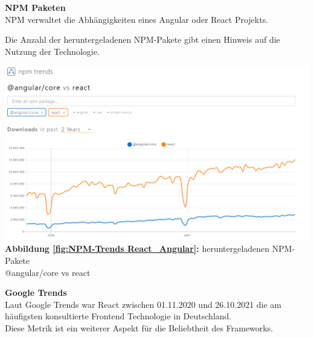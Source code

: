 {\cite{GH04, GH06}}%

\begin{flushleft}

\textbf{NPM Paketen}\\
NPM verwaltet die Abhängigkeiten eines Angular oder React Projekts.

Die Anzahl der heruntergeladenen NPM-Pakete gibt einen Hinweis auf die Nutzung der Technologie.
\end{flushleft}

\begin{center}
  \includegraphics[scale=0.4]
  {sources/NPM-Trends React_Angular}\label{fig:NPM-Trends React_Angular}\\
  \textbf{Abbildung \autoref{fig:NPM-Trends React_Angular}:} heruntergeladenen NPM-Pakete \\@angular/core vs react
    {\cite{NPM01}}
\end{center}

\newpage

\begin{flushleft}
\textbf{Google Trends}\\
Laut Google Trends war React zwischen 01.11.2020 und 26.10.2021 die am häufigsten konsultierte Frontend Technologie in Deutschland.
\\
Diese Metrik ist ein weiterer Aspekt für die Beliebtheit des Frameworks.
\end{flushleft}

